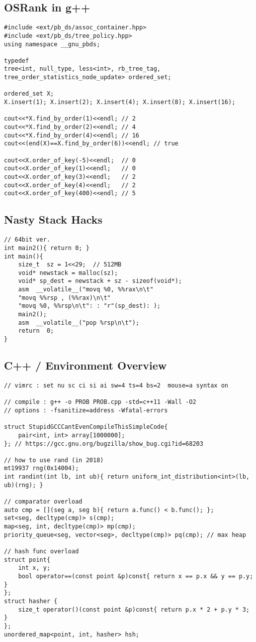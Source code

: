 \documentclass[landscape, 8pt, a4paper, oneside, twocolumn]{extarticle}
\begin{document}
\subsection {OSRank in g++}
\begin{verbatim}
#include <ext/pb_ds/assoc_container.hpp>
#include <ext/pb_ds/tree_policy.hpp>
using namespace __gnu_pbds;

typedef
tree<int, null_type, less<int>, rb_tree_tag, tree_order_statistics_node_update> ordered_set;

ordered_set X;
X.insert(1); X.insert(2); X.insert(4); X.insert(8); X.insert(16);

cout<<*X.find_by_order(1)<<endl; // 2
cout<<*X.find_by_order(2)<<endl; // 4
cout<<*X.find_by_order(4)<<endl; // 16
cout<<(end(X)==X.find_by_order(6))<<endl; // true

cout<<X.order_of_key(-5)<<endl;  // 0
cout<<X.order_of_key(1)<<endl;   // 0
cout<<X.order_of_key(3)<<endl;   // 2
cout<<X.order_of_key(4)<<endl;   // 2
cout<<X.order_of_key(400)<<endl; // 5
\end{verbatim}
\subsection {Nasty Stack Hacks}
\begin{verbatim}
// 64bit ver.
int main2(){ return 0; }
int main(){
	size_t  sz = 1<<29;  // 512MB
	void* newstack = malloc(sz);
	void* sp_dest = newstack + sz - sizeof(void*);
	asm  __volatile__("movq %0, %%rax\n\t"
	"movq %%rsp , (%%rax)\n\t"
	"movq %0, %%rsp\n\t": : "r"(sp_dest): );
	main2();
	asm  __volatile__("pop %rsp\n\t");
	return  0;
}
\end{verbatim}
\subsection {C++ / Environment Overview}
\begin{verbatim}
// vimrc : set nu sc ci si ai sw=4 ts=4 bs=2  mouse=a syntax on

// compile : g++ -o PROB PROB.cpp -std=c++11 -Wall -O2
// options : -fsanitize=address -Wfatal-errors

struct StupidGCCCantEvenCompileThisSimpleCode{
	pair<int, int> array[1000000];
}; // https://gcc.gnu.org/bugzilla/show_bug.cgi?id=68203

// how to use rand (in 2018)
mt19937 rng(0x14004);
int randint(int lb, int ub){ return uniform_int_distribution<int>(lb, ub)(rng); }

// comparator overload
auto cmp = [](seg a, seg b){ return a.func() < b.func(); };
set<seg, decltype(cmp)> s(cmp);
map<seg, int, decltype(cmp)> mp(cmp);
priority_queue<seg, vector<seg>, decltype(cmp)> pq(cmp); // max heap

// hash func overload
struct point{
    int x, y;
    bool operator==(const point &p)const{ return x == p.x && y == p.y; }
};
struct hasher {
    size_t operator()(const point &p)const{ return p.x * 2 + p.y * 3; }
};
unordered_map<point, int, hasher> hsh;
\end{verbatim}
\end{document}
